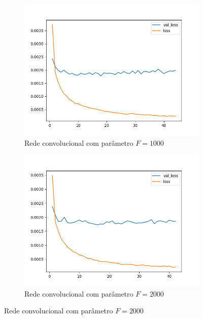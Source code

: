 \begin{figure}[p]
\begin{subfigure}{.5\textwidth}
  \label{fig:cnn-500-k-2}
\end{subfigure}
\begin{subfigure}{.5\textwidth}
  \centering
  \caption{Rede convolucional com parâmetro $F = 1000$}
  \includegraphics[width=.8\linewidth]{figuras/ape-ajustes-hiper-parametros/cnn-1000-k-2.png}
  
  \label{fig:cnn-1000-k-2}
\end{subfigure}
\begin{subfigure}{.5\textwidth}
  \centering
  \caption{Rede convolucional com parâmetro $F = 2000$}
  \includegraphics[width=.8\linewidth]{figuras/ape-ajustes-hiper-parametros/cnn-2000-k-2.png}
  

\end{subfigure}
\end{figure}
